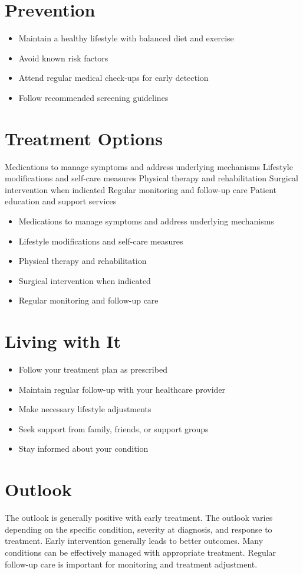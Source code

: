 \section{Prevention}
\begin{itemize}[noitemsep]
  \item Maintain a healthy lifestyle with balanced diet and exercise
  \item Avoid known risk factors
  \item Attend regular medical check-ups for early detection
  \item Follow recommended screening guidelines
\end{itemize}
\section{Treatment Options}
Medications to manage symptoms and address underlying mechanisms Lifestyle modifications and self-care measures Physical therapy and rehabilitation Surgical intervention when indicated Regular monitoring and follow-up care Patient education and support services

\begin{itemize}[noitemsep]
  \item Medications to manage symptoms and address underlying mechanisms
  \item Lifestyle modifications and self-care measures
  \item Physical therapy and rehabilitation
  \item Surgical intervention when indicated
  \item Regular monitoring and follow-up care
\end{itemize}
\section{Living with It}
\begin{itemize}[noitemsep]
  \item Follow your treatment plan as prescribed
  \item Maintain regular follow-up with your healthcare provider
  \item Make necessary lifestyle adjustments
  \item Seek support from family, friends, or support groups
  \item Stay informed about your condition
\end{itemize}
\section{Outlook}
The outlook is generally positive with early treatment. The outlook varies depending on the specific condition, severity at diagnosis, and response to treatment. Early intervention generally leads to better outcomes. Many conditions can be effectively managed with appropriate treatment. Regular follow-up care is important for monitoring and treatment adjustment.
